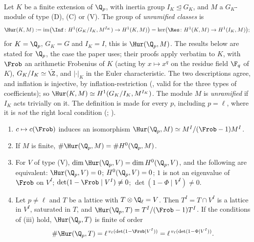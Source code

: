 \begin{definition}\label{def:galcoh:unramified}
Let $K$ be a finite extension of $\Q_p$, with inertia group $I_K\trianglelefteq G_K$, and $M$ a $G_K$-module of type (D), (C) or (V). The group of \emph{unramified classes} is
\[
\Hur(K,M):=\operatorname{im}\bigl(\Inf\colon H^1(G_K/I_K,M^{I_K})\to H^1(K,M)\bigr)=\ker\bigl(\Res\colon H^1(K,M)\to H^1(I_K,M)\bigr);
\]
for $K=\Q_p$, $G_K=G$ and $I_K=I$, this is $\Hur(\Q_p,M)$. The results below are stated for $\Q_p$, the case the paper uses; their proofs apply verbatim to $K$, with
$\Frob$ an arithmetic Frobenius of $K$ (acting by $x\mapsto x^{q}$ on the residue field $\F_q$ of $K$), $G_K/I_K\simeq\hat\Z$, and $|\cdot|_K$ in the Euler characteristic.
The two descriptions agree, and inflation is injective, by inflation-restriction (, valid for the three types of coefficients); so
$\Hur(K,M)\simeq H^1(G_K/I_K,M^{I_K})$. The module $M$ is \emph{unramified} if $I_K$ acts trivially on it. The definition is made for every $p$, including $p=\ell$, where it is
\emph{not} the right local condition (; ).
\end{definition}

\begin{proposition}\label{prop:galcoh:unramified-computed}
\begin{enumerate}[label=(\roman*)]
\item $c\mapsto c(\Frob)$ induces an isomorphism $\Hur(\Q_p,M)\simeq M^I/(\Frob-1)M^I$.
\item If $M$ is finite, $\#\Hur(\Q_p,M)=\#H^0(\Q_p,M)$.
\item For $V$ of type (V), $\dim\Hur(\Q_p,V)=\dim H^0(\Q_p,V)$, and the following are equivalent: $\Hur(\Q_p,V)=0$; $H^0(\Q_p,V)=0$; $1$ is not an eigenvalue of
$\Frob$ on $V^I$; $\det(1-\Frob\mid V^I)\ne0$; $\det(1-\Phi\mid V^I)\ne0$.
\item Let $p\ne\ell$ and $T$ be a lattice with $T\otimes\Q_\ell=V$. Then $T^I=T\cap V^I$ is a lattice in $V^I$, saturated in $T$, and $\Hur(\Q_p,T)=T^I/(\Frob-1)T^I$. If the
conditions of (iii) hold, $\Hur(\Q_p,T)$ is finite of order
\[
\#\Hur(\Q_p,T)=\ell^{\,v_\ell(\det(1-\Frob\mid V^I))}=\ell^{\,v_\ell(\det(1-\Phi\mid V^I))}.
\]
\end{enumerate}
\end{proposition}

